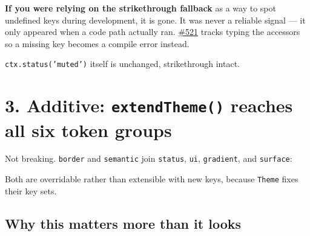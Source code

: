 \textbf{If you were relying on the strikethrough fallback} as a way to spot undefined keys during development, it is gone. It was never a reliable signal --- it only appeared when a code path actually ran. \href{https://github.com/flyingrobots/bijou/issues/521}{\#521} tracks typing the accessors so a missing key becomes a compile error instead.

\texttt{c\allowbreak{}t\allowbreak{}x\allowbreak{}.\allowbreak{}s\allowbreak{}t\allowbreak{}a\allowbreak{}t\allowbreak{}u\allowbreak{}s\allowbreak{}(\allowbreak{}'\allowbreak{}m\allowbreak{}u\allowbreak{}t\allowbreak{}e\allowbreak{}d\allowbreak{}'\allowbreak{})} itself is unchanged, strikethrough intact.

\section{\texorpdfstring{3. Additive: \texttt{e\allowbreak{}x\allowbreak{}t\allowbreak{}e\allowbreak{}n\allowbreak{}d\allowbreak{}T\allowbreak{}h\allowbreak{}e\allowbreak{}m\allowbreak{}e\allowbreak{}(\allowbreak{})} reaches all six token groups}{3. Additive:  reaches all six token groups}}\label{record-273-additive-extendtheme-reaches-all-six-token-groups}

Not breaking. \texttt{b\allowbreak{}o\allowbreak{}r\allowbreak{}d\allowbreak{}e\allowbreak{}r} and \texttt{s\allowbreak{}e\allowbreak{}m\allowbreak{}a\allowbreak{}n\allowbreak{}t\allowbreak{}i\allowbreak{}c} join \texttt{s\allowbreak{}t\allowbreak{}a\allowbreak{}t\allowbreak{}u\allowbreak{}s}, \texttt{u\allowbreak{}i}, \texttt{g\allowbreak{}r\allowbreak{}a\allowbreak{}d\allowbreak{}i\allowbreak{}e\allowbreak{}n\allowbreak{}t}, and \texttt{s\allowbreak{}u\allowbreak{}r\allowbreak{}f\allowbreak{}a\allowbreak{}c\allowbreak{}e}:


Both are overridable rather than extensible with new keys, because \texttt{T\allowbreak{}h\allowbreak{}e\allowbreak{}m\allowbreak{}e} fixes their key sets.

\subsection{Why this matters more than it looks}\label{record-273-why-this-matters-more-than-it-looks}


